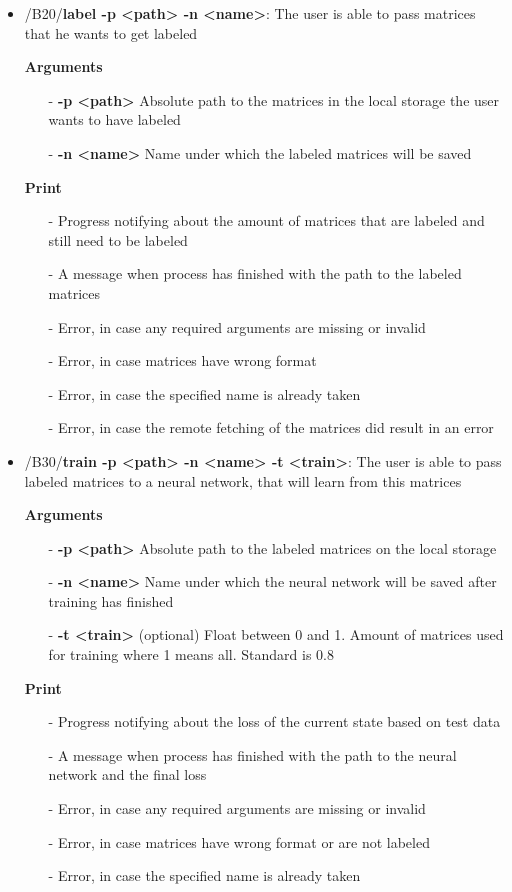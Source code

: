\documentclass[parskip=full]{scrartcl}
\begin{document}
\begin{itemize}
\item/B20/\textbf{label -p <path> -n <name>}:
\newline The user is able to pass matrices that he wants to get labeled

\textbf{Arguments}
	\begin{itemize}
	\item[-]\textbf{-p <path>} Absolute path to the matrices in the local storage the user wants to have labeled
	\item[-]\textbf{-n <name>} Name under which the labeled matrices will be saved
	\end{itemize}

\textbf{Print}
	\begin{itemize}
	\item[-]Progress notifying about the amount of matrices that are labeled and still need to be labeled
	\item[-]A message when process has finished with the path to the labeled matrices
	\item[-]Error, in case any required arguments are missing or invalid
	\item[-]Error, in case matrices have wrong format
	\item[-]Error, in case the specified name is already taken
	\item[-]Error, in case the remote fetching of the matrices did result in an error
	\end{itemize}

\item/B30/\textbf{train -p <path> -n <name> -t <train>}:
\newline The user is able to pass labeled matrices to a neural network, that will learn from this matrices

\textbf{Arguments}
	\begin{itemize}
	\item[-]\textbf{-p <path>} Absolute path to the labeled matrices on the local storage
	\item[-]\textbf{-n <name>} Name under which the neural network will be saved after training has finished
	\item[-]\textbf{-t <train>} (optional) Float between 0 and 1. Amount of matrices used for training where 1 means all. Standard is 0.8
	\end{itemize}

\textbf{Print}
	\begin{itemize}
	\item[-]Progress notifying about the loss of the current state based on test data
	\item[-]A message when process has finished with the path to the neural network and the final loss
	\item[-]Error, in case any required arguments are missing or invalid
	\item[-]Error, in case matrices have wrong format or are not labeled
	\item[-]Error, in case the specified name is already taken
	\end{itemize}


\end{itemize}
\end{document}
